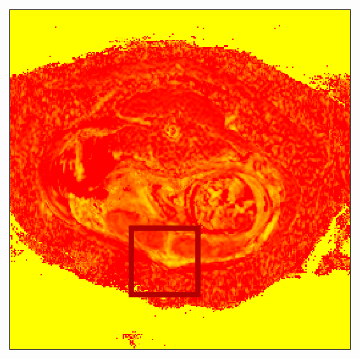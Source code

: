 \begin{figure}
\begin{centering}
\begin{subfigure}{0.5\textwidth}
\begin{centering}
                        \caption{}
                    \end{centering}
                \end{subfigure}
                \begin{subfigure}{0.4\textwidth}
                    \begin{centering}
                        \includegraphics[width=\textwidth]{diagrams/results-mri/fits/real-mri_ivim.png}
                        \caption{}
                        \label{fig:mri-ivim:real}
                    \end{centering}
                \end{subfigure}
                \begin{subfigure}{0.5\textwidth}
                    \begin{centering}

\end{centering}
\end{subfigure}
\end{centering}
\end{figure}

